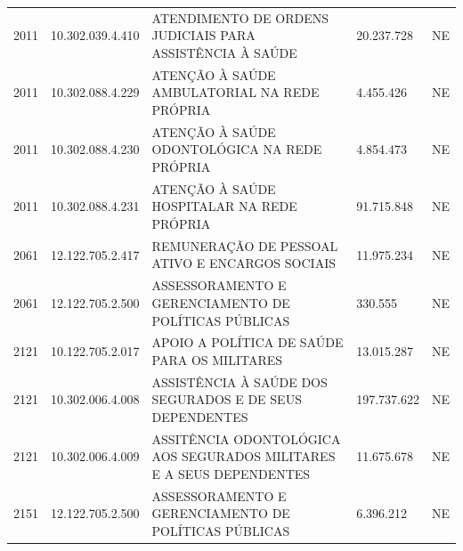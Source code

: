 \documentclass{article}
\begin{document}
\begin{longtable}[c]{m{1cm}|m{2cm}|m{10cm}|m{2cm}|m{1cm}}
\multicolumn{1}{C{1cm}|}{2011} & \multicolumn{1}{C{2cm}|}{10.302.039.4.410} & \multicolumn{1}{L{10cm}|}{ATENDIMENTO DE ORDENS JUDICIAIS PARA ASSISTÊNCIA À SAÚDE} & \multicolumn{1}{R{2cm}|}{20.237.728} & \multicolumn{1}{C{1cm}}{NE} \\
\multicolumn{1}{C{1cm}|}{2011} & \multicolumn{1}{C{2cm}|}{10.302.088.4.229} & \multicolumn{1}{L{10cm}|}{ATENÇÃO À SAÚDE AMBULATORIAL NA REDE PRÓPRIA} & \multicolumn{1}{R{2cm}|}{4.455.426} & \multicolumn{1}{C{1cm}}{NE} \\
\multicolumn{1}{C{1cm}|}{2011} & \multicolumn{1}{C{2cm}|}{10.302.088.4.230} & \multicolumn{1}{L{10cm}|}{ATENÇÃO À SAÚDE ODONTOLÓGICA NA REDE PRÓPRIA} & \multicolumn{1}{R{2cm}|}{4.854.473} & \multicolumn{1}{C{1cm}}{NE} \\
\multicolumn{1}{C{1cm}|}{2011} & \multicolumn{1}{C{2cm}|}{10.302.088.4.231} & \multicolumn{1}{L{10cm}|}{ATENÇÃO À SAÚDE HOSPITALAR NA REDE PRÓPRIA} & \multicolumn{1}{R{2cm}|}{91.715.848} & \multicolumn{1}{C{1cm}}{NE} \\
\multicolumn{1}{C{1cm}|}{2061} & \multicolumn{1}{C{2cm}|}{12.122.705.2.417} & \multicolumn{1}{L{10cm}|}{REMUNERAÇÃO DE PESSOAL ATIVO E ENCARGOS SOCIAIS} & \multicolumn{1}{R{2cm}|}{11.975.234} & \multicolumn{1}{C{1cm}}{NE} \\
\multicolumn{1}{C{1cm}|}{2061} & \multicolumn{1}{C{2cm}|}{12.122.705.2.500} & \multicolumn{1}{L{10cm}|}{ASSESSORAMENTO E GERENCIAMENTO DE POLÍTICAS PÚBLICAS} & \multicolumn{1}{R{2cm}|}{330.555} & \multicolumn{1}{C{1cm}}{NE} \\
\multicolumn{1}{C{1cm}|}{2121} & \multicolumn{1}{C{2cm}|}{10.122.705.2.017} & \multicolumn{1}{L{10cm}|}{APOIO A POLÍTICA DE SAÚDE PARA OS MILITARES} & \multicolumn{1}{R{2cm}|}{13.015.287} & \multicolumn{1}{C{1cm}}{NE} \\
\multicolumn{1}{C{1cm}|}{2121} & \multicolumn{1}{C{2cm}|}{10.302.006.4.008} & \multicolumn{1}{L{10cm}|}{ASSISTÊNCIA À SAÚDE DOS SEGURADOS E DE SEUS DEPENDENTES} & \multicolumn{1}{R{2cm}|}{197.737.622} & \multicolumn{1}{C{1cm}}{NE} \\
\multicolumn{1}{C{1cm}|}{2121} & \multicolumn{1}{C{2cm}|}{10.302.006.4.009} & \multicolumn{1}{L{10cm}|}{ASSITÊNCIA ODONTOLÓGICA AOS SEGURADOS MILITARES E A SEUS DEPENDENTES} & \multicolumn{1}{R{2cm}|}{11.675.678} & \multicolumn{1}{C{1cm}}{NE} \\
\multicolumn{1}{C{1cm}|}{2151} & \multicolumn{1}{C{2cm}|}{12.122.705.2.500} & \multicolumn{1}{L{10cm}|}{ASSESSORAMENTO E GERENCIAMENTO DE POLÍTICAS PÚBLICAS} & \multicolumn{1}{R{2cm}|}{6.396.212} & \multicolumn{1}{C{1cm}}{NE} \\

\end{longtable}
\end{document}
